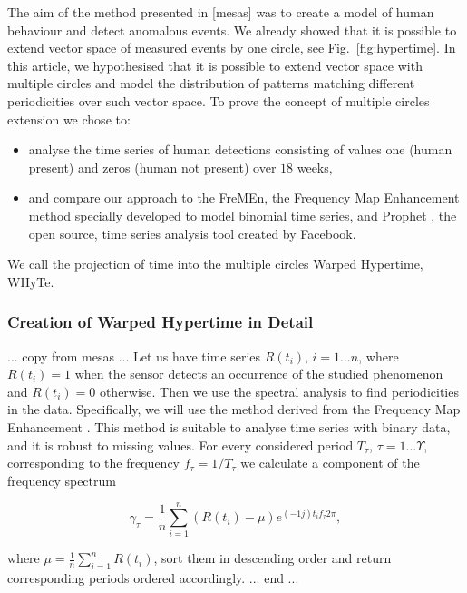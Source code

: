The aim of the method presented in [mesas] was to create a model of human behaviour and detect anomalous events. 
We already showed that it is possible to extend vector space of measured events by one circle, see Fig.~\ref{fig:hypertime}.
In this article, we hypothesised that it is possible to extend vector space with multiple circles and model the distribution of patterns matching different periodicities over such vector space.
To prove the concept of multiple circles extension we chose to: 
\begin{itemize}
	\item analyse the time series of human detections consisting of values one (human present) and zeros (human not present) over $18$ weeks, 
	\item and compare our approach to the FreMEn, the Frequency Map Enhancement method \cite{krajnik2017fremen} specially developed to model binomial time series, and Prophet \cite{taylor2018forecasting}, the open source, time series analysis tool created by Facebook.
\end{itemize}
We call the projection of time into the multiple circles Warped Hypertime, WHyTe.

\subsubsection{Creation of Warped Hypertime in Detail}

... copy from mesas ...
Let us have time series $R\left(t_{i}\right)$, $i = 1 \ldots n$, where $R\left(t_{i}\right) = 1$ when the sensor detects an occurrence of the studied phenomenon and $R\left(t_{i}\right) = 0$ otherwise.
Then we use the spectral analysis to find periodicities in the data. Specifically, we will use the method derived from the Frequency Map Enhancement \cite{krajnik2017fremen}.
This method is suitable to analyse time series with binary data, and it is robust to missing values.
For every considered period $T_{\tau}$, $\tau = 1 \ldots \Upsilon$, corresponding to the frequency ${f}_{\tau} = 1 / T_{\tau}$ we calculate a component of the frequency spectrum

\begin{equation}\label{eq:components}
\gamma_{\tau} = \frac{1}{n} \sum_{i = 1}^{n} (R\left(t_{i}\right)-\mu)e^{(-1j)t_{i}{f}_{\tau}2\pi},
\end{equation}

\noindent where $\mu = \frac{1}{n} \sum_{i = 1}^{n} R\left(t_{i}\right)$, sort them in descending order and return corresponding periods ordered accordingly.
... end ...

